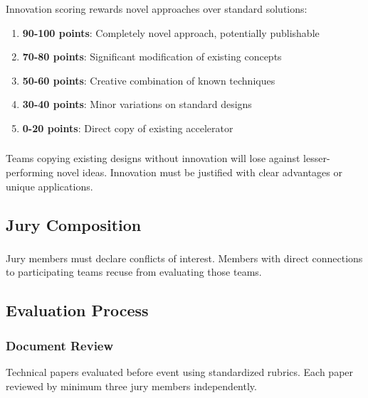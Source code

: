 \subsubsection{}
Innovation scoring rewards novel approaches over standard solutions:

\begin{enumerate}[noitemsep]
    \item \textbf{90-100 points}: Completely novel approach, potentially publishable
    \item \textbf{70-80 points}: Significant modification of existing concepts
    \item \textbf{50-60 points}: Creative combination of known techniques
    \item \textbf{30-40 points}: Minor variations on standard designs
    \item \textbf{0-20 points}: Direct copy of existing accelerator
\end{enumerate}

\subsubsection{}
Teams copying existing designs without innovation will lose against lesser-performing novel ideas. Innovation must be justified with clear advantages or unique applications.

\subsection{Jury Composition}

\subsubsection{}
Jury members must declare conflicts of interest. Members with direct connections to participating teams recuse from evaluating those teams.

\subsection{Evaluation Process}

\subsubsection{Document Review}
Technical papers evaluated before event using standardized rubrics. Each paper reviewed by minimum three jury members independently.

